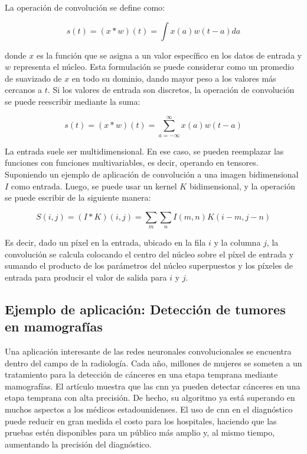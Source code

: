 La operación de convolución se define como:

\begin{equation}
\label{eq:operacion-convolucion1}
s(t) = (x*w)(t) = \int x(a)w(t-a)da
\end{equation}

donde $x$ es la función que se asigna a un valor específico en los datos de entrada y $w$ representa el núcleo. Esta formulación se puede considerar como un promedio de suavizado de $x$ en todo su dominio, dando mayor peso a los valores más cercanos a $t$. Si los valores de entrada son discretos, la operación de convolución se puede reescribir mediante la suma:

\begin{equation}
\label{eq:operacion-convolucion2}
s(t) = (x*w)(t) = \sum_{a=-\infty}^\infty x(a)w(t-a)
\end{equation}

La entrada suele ser multidimensional. En ese caso, se pueden reemplazar las funciones con funciones multivariables, es decir, operando en tensores. Suponiendo un ejemplo de aplicación de convolución a una imagen bidimensional $I$ como entrada. Luego, se puede usar un kernel $K$ bidimensional, y la operación se puede escribir de la siguiente manera:

\begin{equation}
\label{eq:operacion-convolucion3}
S(i,j) = (I*K)(i,j) = \sum_{m} \sum_{n} I(m,n) K (i - m, j - n)
\end{equation}

Es decir, dado un píxel en la entrada, ubicado en la fila $i$ y la columna $j$, la convolución se calcula colocando el centro del núcleo sobre el píxel de entrada y sumando el producto de los parámetros del núcleo superpuestos y los píxeles de entrada para producir el valor de salida para $i$ y $j$.

\subsection*{Ejemplo de aplicación: Detección de tumores en mamografías}
\label{subsec:ejemplos-aplicacion-cnn}

Una aplicación interesante de las redes neuronales convolucionales se encuentra dentro del campo de la radiología. Cada año, millones de mujeres se someten a un tratamiento para la detección de cánceres en una etapa temprana mediante mamografías. El artículo \cite{mammography2019} muestra que las \gls{cnn} ya pueden detectar cánceres en una etapa temprana con alta precisión. De hecho, su algoritmo ya está superando en muchos aspectos a los médicos estadounidenses. El uso de \gls{cnn} en el diagnóstico puede reducir en gran medida el costo para los hospitales, haciendo que las pruebas estén disponibles para un público más amplio y, al mismo tiempo, aumentando la precisión del diagnóstico.

